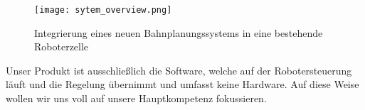 \begin{figure}[h]
	\centering
	\texttt{[image: sytem\_overview.png]}
	\caption{Integrierung eines neuen Bahnplanungssystems in eine bestehende Roboterzelle}
	\label{fig:IntegrationBahnplanungssystem}
\end{figure}

Unser Produkt ist ausschließlich die Software, welche auf der Robotersteuerung läuft und die Regelung übernimmt und umfasst keine Hardware. Auf diese Weise wollen wir uns voll auf unsere Hauptkompetenz fokussieren. 
